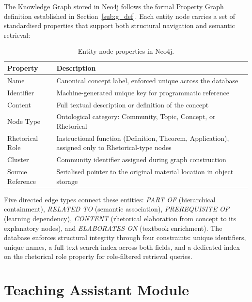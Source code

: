The Knowledge Graph stored in Neo4j follows the formal Property Graph definition established in Section~\ref{sub:g_def}. Each entity node carries a set of standardised properties that support both structural navigation and semantic retrieval:

\begin{table}[H]
\centering

\renewcommand{\arraystretch}{1.2}
\begin{tabularx}{\textwidth}{|l|X|}
\hline
Property & Description \\ \hline
Name & Canonical concept label, enforced unique across the database \\ \hline
Identifier & Machine-generated unique key for programmatic reference \\ \hline
Content & Full textual description or definition of the concept \\ \hline
Node Type & Ontological category: Community, Topic, Concept, or Rhetorical \\ \hline
Rhetorical Role & Instructional function (Definition, Theorem, Application), assigned only to Rhetorical-type nodes \\ \hline
Cluster & Community identifier assigned during graph construction \\ \hline
Source Reference & Serialised pointer to the original material location in object storage \\ \hline
\end{tabularx}
\vspace{12pt}\caption{Entity node properties in Neo4j.}
\label{tab:node_props}
\end{table}

Five directed edge types connect these entities: \textit{PART OF} (hierarchical containment), \textit{RELATED TO} (semantic association), \textit{PREREQUISITE OF} (learning dependency), \textit{CONTENT} (rhetorical elaboration from concept to its explanatory nodes), and \textit{ELABORATES ON} (textbook enrichment). The database enforces structural integrity through four constraints: unique identifiers, unique names, a full-text search index across both fields, and a dedicated index on the rhetorical role property for role-filtered retrieval queries.

\section{Teaching Assistant Module}\label{sec:ta_module}

